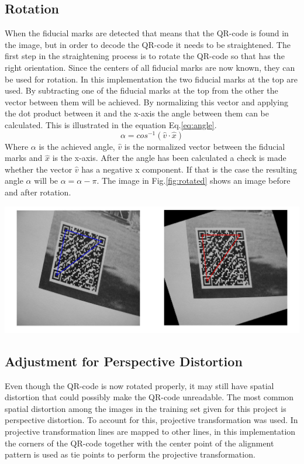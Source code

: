 \documentclass[12pt,a4paper]{article}
\newenvironment{Figure}
  {\par\medskip\noindent\minipage{\linewidth}}
  {\endminipage\par\medskip}
\begin{document}
\subsection{Rotation}
When the fiducial marks are detected that means that the QR-code is found in the image, but in order to decode the QR-code it needs to be straightened. The first step in the straightening process is to rotate the QR-code so that has the right orientation. Since the centers of all fiducial marks are now known, they can be used for rotation. In this implementation the two fiducial marks at the top are used. By subtracting one of the fiducial marks at the top from the other the vector between them will be achieved. By normalizing this vector and applying the dot product between it and the x-axis the angle between them can be calculated. This is illustrated in the equation Eq.\ref{eq:angle}.
\begin{equation}\label{eq:angle}
	\alpha = cos^{-1}(\hat{v} \cdot \hat{x})
\end{equation}
Where $\alpha$ is the achieved angle, $\hat{v}$ is the normalized vector between the fiducial marks and $\hat{x}$ is the x-axis. After the angle has been calculated a check is made whether the vector $\hat{v}$ has a negative x component. If that is the case the resulting angle $\alpha$ will be $\alpha=\alpha-\pi$. The image in Fig.\ref{fig:rotated} shows an image before and after rotation. 
\begin{Figure}
  \centering
    \includegraphics[width=1\linewidth]{./img/rotated.png}
\end{Figure}

\subsection{Adjustment for Perspective Distortion}
Even though the QR-code is now rotated properly, it may still have spatial distortion that could possibly make the QR-code unreadable. The most common spatial distortion among the images in the training set given for this project is perspective distortion. To account for this, projective transformation was used. In projective transformation lines are mapped to other lines, in this implementation the corners of the QR-code together with the center point of the alignment pattern is used as tie points to perform the projective transformation.
\end{document}
